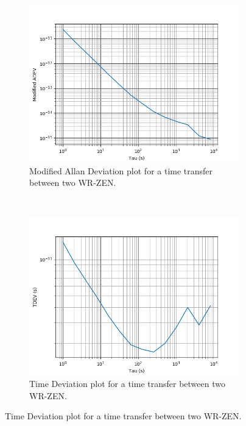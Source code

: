 \begin{figure}
	\centering
	\begin{subfigure}[t]{0.48\textwidth}
		\includegraphics[width=\textwidth]{img/mdev_exp1}
		\caption[MDEV plot for the WR-ZEN]{Modified Allan Deviation plot for a 
		time transfer between two WR-ZEN.}
		\label{fig:mdev_exp1}
	\end{subfigure}
	~ %
	\begin{subfigure}[t]{0.48\textwidth}
		\includegraphics[width=\textwidth]{img/tdev_exp1}
		\caption[TDEV plot for the WR-ZEN]{Time Deviation plot for a time 
		transfer between two WR-ZEN.}
		\label{fig:tdev_exp1}
	\end{subfigure}
\end{figure}

